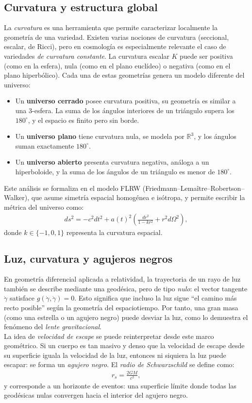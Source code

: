 \documentclass{aleph-revista}
\begin{document}
\subsection*{Curvatura y estructura global}
La \textit{curvatura} es una herramienta que permite caracterizar localmente la geometría de una variedad. Existen varias nociones de curvatura (seccional, escalar, de Ricci), pero en cosmología es especialmente relevante el caso de variedades \textit{de curvatura constante}. La curvatura escalar $K$ puede ser positiva (como en la esfera), nula (como en el plano euclídeo) o negativa (como en el plano hiperbólico). Cada una de estas geometrías genera un modelo diferente del universo:
\begin{itemize}
  \item Un \textbf{universo cerrado} posee curvatura positiva, su geometría es similar a una 3-esfera. La suma de los ángulos interiores de un triángulo supera los $180^\circ$, y el espacio es finito pero sin borde.
  \item Un \textbf{universo plano} tiene curvatura nula, se modela por $\mathbb{R}^3$, y los ángulos suman exactamente $180^\circ$.
  \item Un \textbf{universo abierto} presenta curvatura negativa, análoga a un hiperboloide, y la suma de los ángulos de un triángulo es menor de $180^\circ$.
\end{itemize}
Este análisis se formaliza en el modelo FLRW (Friedmann–Lemaître–Robertson–Walker), que asume simetría espacial homogénea e isótropa, y permite escribir la métrica del universo como:
\begin{align*}
  ds^2 = -c^2dt^2 + a(t)^2 \left( \frac{dr^2}{1 - kr^2} + r^2 d\Omega^2 \right),
\end{align*}
donde $k \in \{-1, 0, 1\}$ representa la curvatura espacial.
\subsection*{Luz, curvatura y agujeros negros}
En geometría diferencial aplicada a relatividad, la trayectoria de un rayo de luz también se describe mediante una geodésica, pero de tipo \textit{nulo}: el vector tangente $\dot{\gamma}$ satisface $g(\dot{\gamma}, \dot{\gamma}) = 0$. Esto significa que incluso la luz sigue “el camino más recto posible” según la geometría del espaciotiempo. Por tanto, una gran masa (como una estrella o un agujero negro) puede desviar la luz, como lo demuestra el fenómeno del \textit{lente gravitacional}.\\
La idea de \textit{velocidad de escape} se puede reinterpretar desde este marco geométrico. Si un cuerpo es tan masivo y denso que la velocidad de escape desde su superficie iguala la velocidad de la luz, entonces ni siquiera la luz puede escapar: se forma un \textit{agujero negro}. El \textit{radio de Schwarzschild} se define como:
\begin{align*}
  r_s = \frac{2GM}{c^2}, 
\end{align*}
y corresponde a un horizonte de eventos: una superficie límite donde todas las geodésicas nulas convergen hacia el interior del agujero negro.
\end{document}

